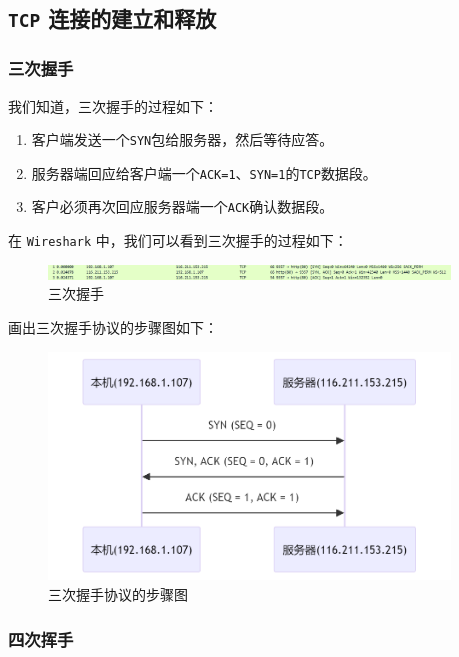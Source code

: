 \documentclass{article}
\begin{document}
\subsection{\texttt{TCP} 连接的建立和释放}

\subsubsection{三次握手}

我们知道，三次握手的过程如下：

\begin{enumerate}[noitemsep]
  \item 客户端发送一个\texttt{SYN}包给服务器，然后等待应答。
  \item 服务器端回应给客户端一个\texttt{ACK=1}、\texttt{SYN=1}的\texttt{TCP}数据段。
  \item 客户必须再次回应服务器端一个\texttt{ACK}确认数据段。
\end{enumerate}

在 \texttt{Wireshark} 中，我们可以看到三次握手的过程如下：

\begin{figure}[H]
  \centering
  \includegraphics[width=0.95\textwidth]{img/6.png}
  \caption{三次握手}
\end{figure}

画出三次握手协议的步骤图如下：

\begin{figure}[H]
  \centering
  \includegraphics[width=0.95\textwidth]{img/7.png}
  \caption{三次握手协议的步骤图}
\end{figure}

\subsubsection{四次挥手}
\end{document}
